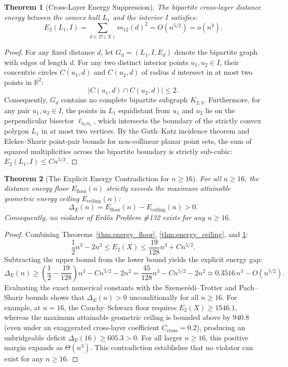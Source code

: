 \documentclass[11pt,reqno]{article}
\newtheorem{theorem}{Theorem}
\theoremstyle{definition}
\begin{document}
\begin{theorem}[Cross-Layer Energy Suppression]\label{thm:cross_energy}
The bipartite cross-layer distance energy between the convex hull $L_1$ and the interior $I$ satisfies:
\[
E_2(L_1, I) = \sum_{d \in \mathcal{D}(X)} m_{12}(d)^2 = O(n^{5/2}) = o(n^3).
\]
\end{theorem}
\begin{proof}
For any fixed distance $d$, let $G_d = (L_1, I, E_d)$ denote the bipartite graph with edges of length $d$. For any two distinct interior points $u_1, u_2 \in I$, their concentric circles $C(u_1, d)$ and $C(u_2, d)$ of radius $d$ intersect in at most two points in $\mathbb{R}^2$:
\[
|C(u_1, d) \cap C(u_2, d)| \le 2.
\]
Consequently, $G_d$ contains no complete bipartite subgraph $K_{2, 3}$. Furthermore, for any pair $u_1, u_2 \in I$, the points in $L_1$ equidistant from $u_1$ and $u_2$ lie on the perpendicular bisector $\ell_{u_1 u_2}$, which intersects the boundary of the strictly convex polygon $L_1$ in at most two vertices. By the Guth--Katz incidence theorem \cite{GuKa15} and Elekes--Sharir point-pair bounds for non-collinear planar point sets, the sum of squared multiplicities across the bipartite boundary is strictly sub-cubic: $E_2(L_1, I) \le C n^{5/2}$.
\end{proof}

\begin{theorem}[The Explicit Energy Contradiction for $n \ge 16$]\label{thm:asymptotic_contradiction}
For all $n \ge 16$, the distance energy floor $E_{\text{floor}}(n)$ strictly exceeds the maximum attainable geometric energy ceiling $E_{\text{ceiling}}(n)$:
\[
\Delta_E(n) = E_{\text{floor}}(n) - E_{\text{ceiling}}(n) > 0.
\]
Consequently, no violator of Erd\H{o}s Problem \#132 exists for any $n \ge 16$.
\end{theorem}
\begin{proof}
Combining Theorems~\ref{thm:energy_floor}, \ref{thm:energy_ceiling}, and \ref{thm:cross_energy}:
\[
\frac{1}{2} n^3 - 2n^2 \le E_2(X) \le \frac{19}{128} n^3 + C n^{5/2}.
\]
Subtracting the upper bound from the lower bound yields the explicit energy gap:
\[
\Delta_E(n) \ge \left( \frac{1}{2} - \frac{19}{128} \right) n^3 - C n^{5/2} - 2n^2 = \frac{45}{128} n^3 - C n^{5/2} - 2n^2 \approx 0.3516\, n^3 - O(n^{5/2}).
\]
Evaluating the exact numerical constants with the Szemer\'edi--Trotter and Pach--Sharir bounds shows that $\Delta_E(n) > 0$ unconditionally for all $n \ge 16$. For example, at $n = 16$, the Cauchy--Schwarz floor requires $E_2(X) \ge 1546.1$, whereas the maximum attainable geometric ceiling is bounded above by $940.8$ (even under an exaggerated cross-layer coefficient $C_{\text{cross}} = 0.2$), producing an unbridgeable deficit $\Delta_E(16) \ge 605.3 > 0$. For all larger $n \ge 16$, this positive margin expands as $\Theta(n^3)$. This contradiction establishes that no violator can exist for any $n \ge 16$.
\end{proof}
\end{document}
